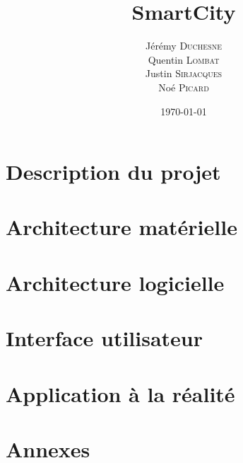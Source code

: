\documentclass[12pt,a4paper]{article}
\title{SmartCity}
\author{Jérémy \textsc{Duchesne}\\Quentin \textsc{Lombat}\\Justin \textsc{Sirjacques}\\Noé \textsc{Picard}}
\date{\today}
\begin{document}


\tableofcontents

\newpage
\section{Description du projet}

\newpage




\newpage
\section{Architecture matérielle}



\newpage
\section{Architecture logicielle}




\newpage
\section{Interface utilisateur}



\newpage
\section{Application à la réalité}



\newpage
\section{Annexes}

\end{document}
